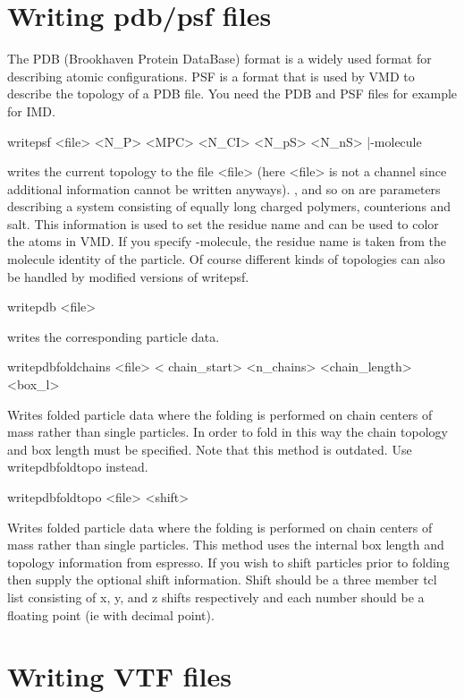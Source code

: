 \section{Writing pdb/psf files}
The PDB (Brookhaven Protein DataBase) format is a widely used format
for describing atomic configurations. PSF is a format that is used by
VMD to describe the topology of a PDB file. You need the PDB and PSF
files for example for IMD.
\begin{tclcode}
writepsf <file> { <N_P> <MPC> <N_CI> <N_pS> <N_nS> }|-molecule
\end{tclcode}
writes the current topology to the file <file> (here <file> is not a
channel since additional information cannot be written anyways).
,  and so on are parameters describing a system
consisting of equally long charged polymers, counterions and salt.
This information is used to set the residue name and can be used to
color the atoms in VMD. If you specify -molecule, the residue name is
taken from the molecule identity of the particle. Of course different
kinds of topologies can also be handled by modified versions of
writepsf.
\begin{code}
writepdb <file>
\end{code}
writes the corresponding particle data.
\begin{tclcode}
writepdbfoldchains <file> { < chain_start> <n_chains> <chain_length>
 <box_l> }
\end{tclcode}
Writes folded particle data where the folding is performed on chain
centers of mass rather than single particles. In order to fold in this
way the chain topology and box length must be specified. Note that
this method is outdated. Use writepdbfoldtopo instead.
\begin{tclcode}
writepdbfoldtopo <file> { <shift> } 
\end{tclcode}
Writes folded particle data where the folding is performed on chain
centers of mass rather than single particles. This method uses the
internal box length and topology information from espresso. If you
wish to shift particles prior to folding then supply the optional
shift information. Shift should be a three member tcl list consisting
of x, y, and z shifts respectively and each number should be a
floating point (ie with decimal point).

\section{Writing VTF files}

